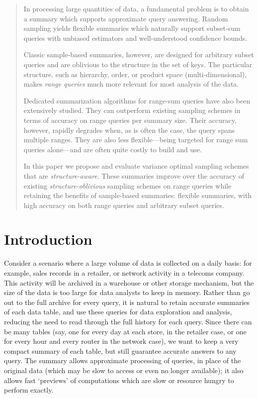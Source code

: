 \documentclass[11pt]{article}
\begin{document}
\begin{abstract}
In processing large quantities of data, a fundamental problem is to
obtain a summary which supports approximate query answering.  Random
sampling yields flexible summaries which naturally support subset-sum
queries with unbiased estimators and well-understood confidence
bounds.

Classic sample-based summaries, however, are designed for arbitrary
subset queries and are oblivious to the structure in the set of keys.
The particular structure, such as hierarchy, order, or product space
(multi-dimensional), makes {\em range queries} much more relevant for
most analysis of the data.

Dedicated summarization algorithms for range-sum queries have also been
extensively studied.  They can outperform existing sampling schemes in
terms of accuracy on range queries per summary size. Their accuracy,
however, rapidly degrades when, as is often the case, the query spans
multiple ranges.  
They are also less flexible---being targeted for range sum
queries alone---and are often quite costly to build and use.

In this paper we propose and evaluate variance optimal sampling
schemes that are {\em structure-aware}.  
These summaries improve over 
the accuracy of existing {\em structure-oblivious} sampling schemes on
range queries while retaining the benefits of sample-based summaries:
flexible summaries, with high accuracy on 
both range queries and arbitrary subset queries.
\end{abstract}

\section{Introduction}
Consider a scenario where a large volume of data is collected on a
daily basis: for example, sales records in a retailer, or network
activity in a telecoms company. 
This activity will be archived in a warehouse or other storage
mechanism, but the size of the data is too large for data analysts 
to keep in memory. 
Rather than go out to the full archive for every query, it is natural
to retain accurate summaries of each data table, and use these queries
for data exploration and analysis, reducing the need to read through
the full history for each query. 
Since there can be many tables (say, one for every day at each store,
in the retailer case, or one for every hour and every router in the
network case), we want to keep a very compact summary of each table,
but still guarantee accurate answers to any query. 
The summary allows approximate processing of queries, 
in place of the original data (which may be slow to access or even no
longer available); it also allows fast `previews' of computations
which are slow or resource hungry to perform exactly.
\end{document}
